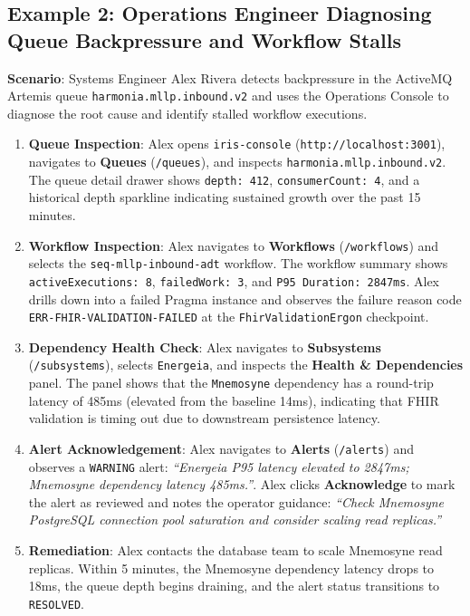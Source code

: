 \subsection{Example 2: Operations Engineer Diagnosing Queue Backpressure and Workflow Stalls}

\textbf{Scenario}: Systems Engineer Alex Rivera detects backpressure in the ActiveMQ Artemis queue \texttt{harmonia.mllp.inbound.v2} and uses the Operations Console to diagnose the root cause and identify stalled workflow executions.

\begin{enumerate}
    \item \textbf{Queue Inspection}: Alex opens \texttt{iris-console} (\texttt{http://localhost:3001}), navigates to \textbf{Queues} (\texttt{/queues}), and inspects \texttt{harmonia.mllp.inbound.v2}. The queue detail drawer shows \texttt{depth: 412}, \texttt{consumerCount: 4}, and a historical depth sparkline indicating sustained growth over the past 15 minutes.
    \item \textbf{Workflow Inspection}: Alex navigates to \textbf{Workflows} (\texttt{/workflows}) and selects the \texttt{seq-mllp-inbound-adt} workflow. The workflow summary shows \texttt{activeExecutions: 8}, \texttt{failedWork: 3}, and \texttt{P95 Duration: 2847ms}. Alex drills down into a failed Pragma instance and observes the failure reason code \texttt{ERR-FHIR-VALIDATION-FAILED} at the \texttt{FhirValidationErgon} checkpoint.
    \item \textbf{Dependency Health Check}: Alex navigates to \textbf{Subsystems} (\texttt{/subsystems}), selects \texttt{Energeia}, and inspects the \textbf{Health \& Dependencies} panel. The panel shows that the \texttt{Mnemosyne} dependency has a round-trip latency of 485ms (elevated from the baseline 14ms), indicating that FHIR validation is timing out due to downstream persistence latency.
    \item \textbf{Alert Acknowledgement}: Alex navigates to \textbf{Alerts} (\texttt{/alerts}) and observes a \texttt{WARNING} alert: \textit{``Energeia P95 latency elevated to 2847ms; Mnemosyne dependency latency 485ms.''}. Alex clicks \textbf{Acknowledge} to mark the alert as reviewed and notes the operator guidance: \textit{``Check Mnemosyne PostgreSQL connection pool saturation and consider scaling read replicas.''}
    \item \textbf{Remediation}: Alex contacts the database team to scale Mnemosyne read replicas. Within 5 minutes, the Mnemosyne dependency latency drops to 18ms, the queue depth begins draining, and the alert status transitions to \texttt{RESOLVED}.
\end{enumerate}

